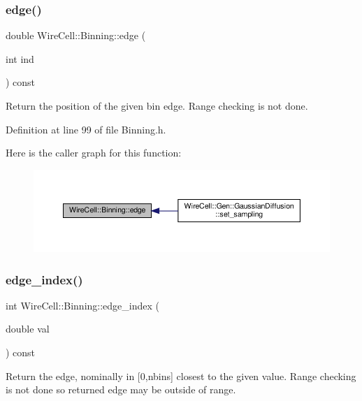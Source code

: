 \subsubsection{\texorpdfstring{edge()}{edge()}}
{\footnotesize\ttfamily double Wire\+Cell\+::\+Binning\+::edge (\begin{DoxyParamCaption}\item[{int}]{ind }\end{DoxyParamCaption}) const\hspace{0.3cm}{\ttfamily [inline]}}

Return the position of the given bin edge. Range checking is not done. 

Definition at line 99 of file Binning.\+h.

Here is the caller graph for this function\+:
\nopagebreak
\begin{figure}[H]
\begin{center}
\leavevmode
\includegraphics[width=350pt]{class_wire_cell_1_1_binning_a0ed21ab262df2a11eac561e53ee3cb77_icgraph}
\end{center}
\end{figure}
\mbox{\label{class_wire_cell_1_1_binning_afb7e010178a3e28729f67d5397b9d3d6}} 
\subsubsection{\texorpdfstring{edge\+\_\+index()}{edge\_index()}}
{\footnotesize\ttfamily int Wire\+Cell\+::\+Binning\+::edge\+\_\+index (\begin{DoxyParamCaption}\item[{double}]{val }\end{DoxyParamCaption}) const\hspace{0.3cm}{\ttfamily [inline]}}

Return the edge, nominally in \mbox{[}0,nbins\mbox{]} closest to the given value. Range checking is not done so returned edge may be outside of range. 

